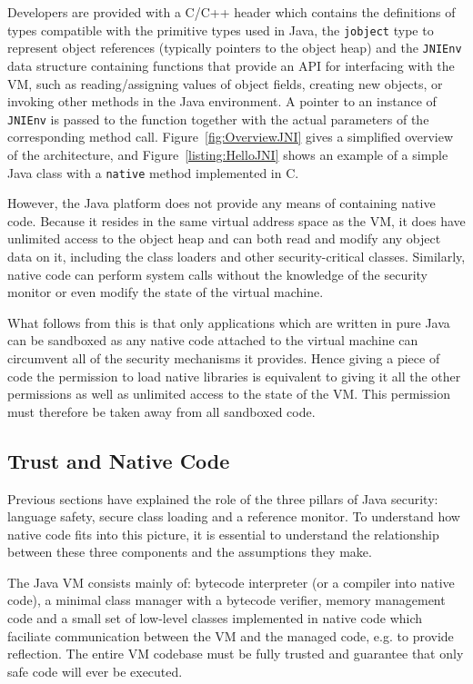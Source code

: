 \documentclass[a4paper,12pt,twoside,openright]{report}
\begin{document}
Developers are provided with a C/C++ header which contains the definitions of types compatible with the primitive types used in Java, the \texttt{jobject} type to represent object references (typically pointers to the object heap) and the \texttt{JNIEnv} data structure containing functions that provide an API for interfacing with the VM, such as reading/assigning values of object fields, creating new objects, or invoking other methods in the Java environment. A pointer to an instance of \texttt{JNIEnv} is passed to the function together with the actual parameters of the corresponding method call. Figure~\ref{fig:OverviewJNI} gives a simplified overview of the architecture, and Figure~\ref{listing:HelloJNI} shows an example of a simple Java class with a \texttt{native} method implemented in C.

However, the Java platform does not provide any means of containing native code. Because it resides in the same virtual address space as the VM, it does have unlimited access to the object heap and can both read and modify any object data on it, including the class loaders and other security-critical classes. Similarly, native code can perform system calls without the knowledge of the security monitor or even modify the state of the virtual machine.

What follows from this is that only applications which are written in pure Java can be sandboxed as any native code attached to the virtual machine can circumvent all of the security mechanisms it provides. Hence giving a piece of code the permission to load native libraries is equivalent to giving it all the other permissions as well as unlimited access to the state of the VM. This permission must therefore be taken away from all sandboxed code.

\subsection{Trust and Native Code}

Previous sections have explained the role of the three pillars of Java security: language safety, secure class loading and a reference monitor. To understand how native code fits into this picture, it is essential to understand the relationship between these three components and the assumptions they make.

The Java VM consists mainly of: bytecode interpreter (or a compiler into native code), a minimal class manager with a bytecode verifier, memory management code and a small set of low-level classes implemented in native code which faciliate communication between the VM and the managed code, e.g. to provide reflection. The entire VM codebase must be fully trusted and guarantee that only safe code will ever be executed.
\end{document}
